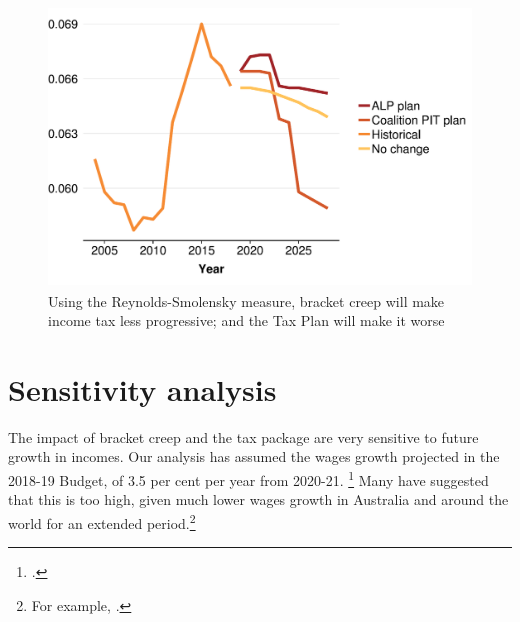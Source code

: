 \documentclass[submission]{grattan}\usepackage[]{graphicx}\usepackage[]{color}
\newenvironment{knitrout}{}{} %
\begin{document}
\begin{figure}
\caption{Using the Reynolds-Smolensky measure, bracket creep will make income tax less progressive; and the Tax Plan will make it worse}\label{fig:progressivity}
\begin{knitrout}
\color{fgcolor}
\includegraphics[width=4.47222in,height=2.92631723826715in]{atlas/progressivities-1} 

\end{knitrout}
\end{figure}

\section{Sensitivity analysis}\label{sec:sensitivity-analysis}

The impact of bracket creep and the tax package are very sensitive to future growth in incomes. Our analysis has assumed the wages growth projected in the 2018-19 Budget, of 3.5 per cent per year from 2020-21.%
  \footcite[][1--10]{Treasury2018a}
Many have suggested that this is too high, given much lower wages growth in Australia and around the world for an extended period.\footnote{For example, \textcite{Knaus}.}
\end{document}
